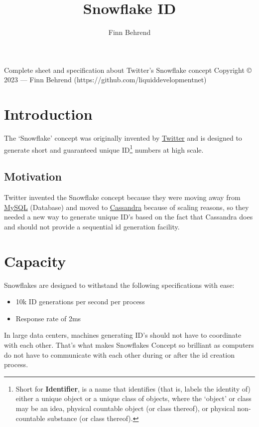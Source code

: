 \documentclass{article}
\title{\textbf{Snowflake ID}}
\author{Finn Behrend}
\begin{document}
\begin{titlingpage}
    \maketitle
    \begin{center}
        \vspace{50px}
        Complete sheet and specification about Twitter's Snowflake concept
        \vfill
        \footnotesize{Copyright \copyright{} 2023 --- Finn Behrend
            (https://github.com/liquiddevelopmentnet)}
    \end{center}
\end{titlingpage}

\tableofcontents

\pagebreak

\section{Introduction}
The `Snowflake' concept was originally invented by
\href{https://twitter.com}{Twitter} and is designed to generate short and
guaranteed unique ID\footnote{Short for \textbf{Identifier},  is a name that
    identifies (that is, labels the identity of) either a unique object or a
    unique
    class of objects, where the `object' or class may be an idea, physical
    countable object (or class thereof), or physical non-countable substance
    (or
    class thereof).} numbers at high scale.

\subsection{Motivation}
Twitter invented the Snowflake concept because they were moving away from
\href{https://en.wikipedia.org/wiki/MySQL}{MySQL} (Database) and moved to
\href{https://en.wikipedia.org/wiki/Cassandra}{Cassandra} because of scaling
reasons, so they needed a new way to generate unique ID's based on the fact
that Cassandra does and should not provide a sequential id generation facility.

\section{Capacity}
Snowflakes are designed to withstand the following specifications with ease:
\begin{itemize}
    \item 10k ID generations per second per process
    \item Response rate of 2ms
\end{itemize}
In large data centers, machines generating ID's should not have to coordinate
with each other. That's what makes Snowflakes Concept so brilliant as computers
do not have to communicate with each other during or after the id creation
process.
\end{document}
